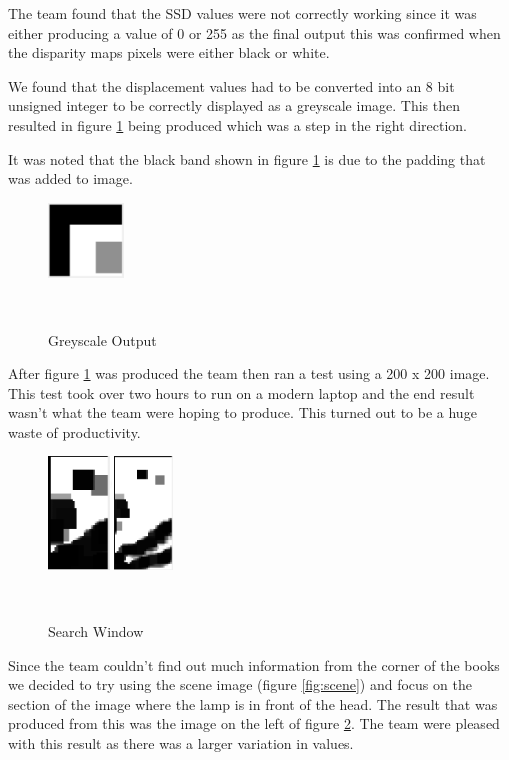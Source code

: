 \documentclass[twocolumn]{article}
\begin{document}
The team found that the SSD values were not correctly working since it was either producing a value of 0 or 255 as the final output this was confirmed when the disparity maps pixels were either black or white. 

 We found that the displacement values had to be converted into an 8 bit unsigned integer to be correctly displayed as a greyscale image. This then resulted in figure \ref{fig:Third_Result} being produced which was a step in the right direction. 

It was noted that the black band shown in figure \ref{fig:Third_Result} is due to the padding that was added to image.  

\begin{figure}
\centering
  \includegraphics[height=20mm]{Figures/Third_Result}
    \caption{Greyscale Output}~\label{fig:Third_Result}
\end{figure} 

After figure \ref{fig:Third_Result} was produced the team then ran a test using a 200 x 200 image. This test took over two hours to run on a modern laptop and the end result wasn't what the team were hoping to produce. This turned out to be a huge waste of productivity.  
 
\begin{figure}[H]
\centering
  \includegraphics[height=30mm]{Figures/Search_Window_Comparison}
    \caption{Search Window}~\label{fig:Search_Window}
\end{figure} 
Since the team couldn't find out much information from the corner of the books we decided to try using the scene image (figure \ref{fig:scene}) and focus on the section of the image where the lamp is in front of the head. The result that was produced from this was the image on the left of figure \ref{fig:Search_Window}. The team were pleased with this result as there was a larger variation in values. 
\end{document}
